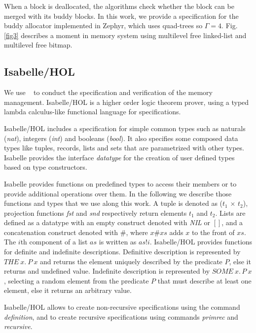 When a block is deallocated, the algorithms check whether the block can be merged with its buddy blocks. In this work, we provide a specification for the buddy allocator implemented in Zephyr, which uses quad-trees so $\Gamma = 4$.  Fig. \ref{fig3} describes a moment in memory system using multilevel free linked-list and multilevel free bitmap.



\subsection{Isabelle/HOL}
We use ~\cite{reg_Isabelle/HOL} to conduct the specification and verification of the memory management. Isabelle/HOL is a higher order logic theorem prover, using a typed lambda calculus-like functional language for specifications.

Isabelle/HOL includes a specification for simple common types such as naturals (\emph{nat}), integers (\emph{int}) and booleans (\emph{bool}). It also specifies some composed data types like tuples, records, lists and sets that are parametrized with other types. Isabelle provides the interface \emph{datatype} for the creation of user defined types based on type constructors. 

Isabelle provides functions on predefined types to access their members or to provide additional operations over them. In the following we describe those functions and types that we use along this work. A tuple is denoted as (\emph{$t_1$} $\times$ \emph{$t_2$}), projection functions \emph{fst} and \emph{snd} respectively return elements $t_1$ and $t_2$. Lists are defined as a datatype with an empty construct denoted with \emph{NIL} or $[]$, and a concatenation construct denoted with $\#$, where $x\#xs$ adds $x$ to the front of $xs$. The $i$th component of a list $as$ is written as $as!i$. Isabelle/HOL provides functions for definite and indefinite descriptions. Definitive description is represented by $THE\ x.\ P\ x$ and returns the element uniquely described by the predicate $P$, else it returns and undefined value. Indefinite description is represented by $SOME\ x.\, P\ x$, selecting a random element from the predicate $P$ that must describe at least one element, else it returns an arbitrary value.

Isabelle/HOL allows  to create non-recursive specifications using the command \emph{definition}, and to create recursive specifications using commands \emph{primrec} and \emph{recursive}.

